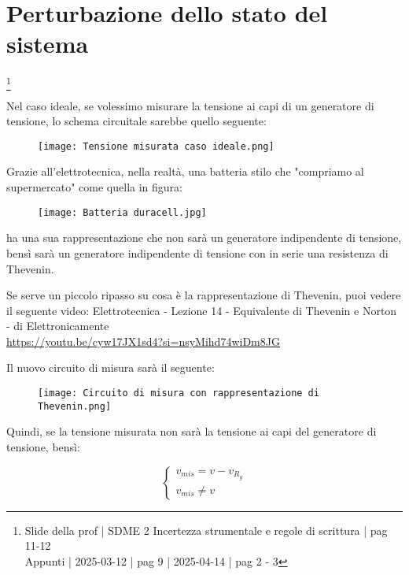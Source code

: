 \newpage 

\section{Perturbazione dello stato del sistema}
\footnote{Slide della prof | SDME 2 Incertezza strumentale e regole di scrittura | pag 11-12 \\  
Appunti | 2025-03-12 | pag 9 | 2025-04-14 | pag 2 - 3}

Nel caso ideale, se volessimo misurare la tensione ai capi di un generatore di tensione, 
lo schema circuitale sarebbe quello seguente: 

\begin{figure}[h]
    \centering
    \texttt{[image: Tensione misurata caso ideale.png]}
\end{figure}

Grazie all'elettrotecnica, nella realtà, una batteria stilo che "compriamo al supermercato" come quella in figura: 

\begin{figure}[h]
    \centering
    \texttt{[image: Batteria duracell.jpg]}
\end{figure}

ha una sua rappresentazione che non sarà un generatore indipendente di tensione, 
bensì sarà un generatore indipendente di tensione con in serie una resistenza di Thevenin. \newline 

\begin{tcolorbox}
    Se serve un piccolo ripasso su cosa è la rappresentazione di Thevenin, 
    puoi vedere il seguente video: \newline 
    Elettrotecnica - Lezione 14 - Equivalente di Thevenin e Norton - di Elettronicamente\\ \url{https://youtu.be/cyw17JX1sd4?si=nsyMihd74wiDm8JG}
\end{tcolorbox}

Il nuovo circuito di misura sarà il seguente: 

\begin{figure}[h]
    \centering
    \texttt{[image: Circuito di misura con rappresentazione di Thevenin.png]}
\end{figure}

Quindi, se la tensione misurata non sarà la tensione ai capi del generatore di tensione, bensì: 

{
    \Large 
    \begin{equation}
        \begin{cases}
            v_{mis} = v - v_{R_{g}} 
            \\ 
            v_{mis} \neq v
        \end{cases}
    \end{equation}
}

